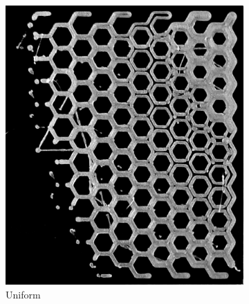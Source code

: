 \begin{figure}
\begin{subfigure}{\figwidth}
\includegraphics[height=\figheight]{sources/applications/P3_print_hex_naive_edited.png}
\caption{Uniform}\label{print_naive}
\end{subfigure}
\begin{subfigure}{\figwidth}\centering

\end{subfigure}
\end{figure}
